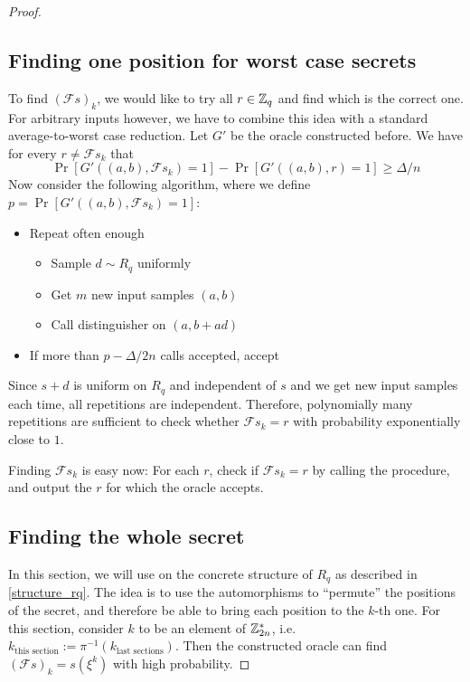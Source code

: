 \begin{proof}
\subsection{Finding one position for worst case secrets}
To find $(\mathcal{F}s)_k$, we would like to try all $r \in \mathbb{Z}_q$ and find which is the correct one. For arbitrary inputs however, we have to combine this idea with a standard average-to-worst case reduction. Let $G'$ be the oracle constructed before. We have for every $r \neq \mathcal{F}s_k$ that
\begin{equation}
\Pr[G'((a, b), \mathcal{F}s_k) = 1] - \Pr[G'((a, b), r) = 1] \geq \Delta / n \nonumber
\end{equation}
Now consider the following algorithm, where we define $p = \Pr[G'((a, b), \mathcal{F}s_k) = 1]$:
\begin{itemize}
\item Repeat often enough
\begin{itemize}
\item Sample $d \sim R_q$ uniformly
\item Get $m$ new input samples $(a, b)$
\item Call distinguisher on $(a, b + ad)$
\end{itemize}
\item If more than $p - \Delta/2n$ calls accepted, accept
\end{itemize}
Since $s + d$ is uniform on $R_q$ and independent of $s$ and we get new input samples each time, all repetitions are independent. Therefore, polynomially many repetitions are sufficient to check whether  $\mathcal{F}s_k = r$ with probability exponentially close to $1$.

Finding $\mathcal{F}s_k$ is easy now: For each $r$, check if $\mathcal{F}s_k = r$ by calling the procedure, and output the $r$ for which the oracle accepts.

\subsection{Finding the whole secret}
In this section, we will use on the concrete structure of $R_q$ as described in \ref{structure_rq}. The idea is to use the automorphisms to ``permute'' the positions of the secret, and therefore be able to bring each position to the $k$-th one. For this section, consider $k$ to be an element of $\mathbb{Z}_{2n}^*$, i.e. $k_{\text{this section}} := \pi^{-1}(k_{\text{last sections}})$. Then the constructed oracle can find $(\mathcal{F}s)_k = s(\xi^k)$ with high probability.


\end{proof}
